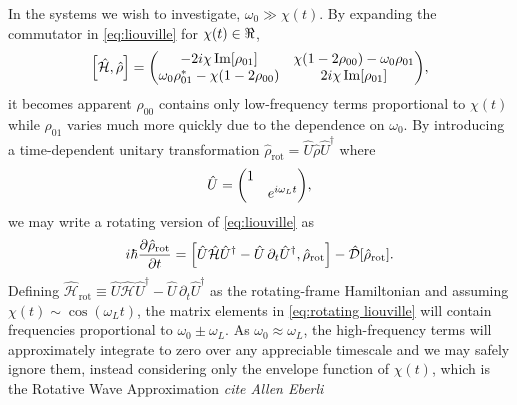 \documentclass[conference]{IEEEtran}
\begin{document}
In the systems we wish to investigate, $\omega_0 \gg \chi(t)$. By expanding the commutator in \cref{eq:liouville} for $\chi(t) \in \real$,
\begin{equation}
  \commutator{\hat{\mathcal{H}}}{\hat{\rho}} =
  \mqty(
    -2 i \chi \Im[\rho_{01}] & \chi\qty(1 - 2 \rho_{00}) - \omega_0 \rho_{01} \\ 
    \omega_0 \rho_{01}^* - \chi\qty(1 - 2\rho_{00}) & 2 i \chi \Im[\rho_{01}]
  ),
\end{equation}
it becomes apparent $\rho_{00}$ contains only low-frequency terms proportional to $\chi(t)$ while $\rho_{01}$ varies much more quickly due to the dependence on $\omega_0$.
By introducing a time-dependent unitary transformation $\hat{\rho}_\text{rot} = \hat{U}\hat{\rho}\hat{U}^\dagger$ where
\begin{equation}
  \hat{U} = \mqty(\dmat{1, e^{i \omega_L t}}), 
  \label{eq:unitary transformation}
\end{equation}
we may write a rotating version of \cref{eq:liouville} as
\begin{equation}
  i \hbar \pdv{\hat{\rho}_\text{rot}}{t} = \commutator{\hat{U} \hat{\mathcal{H}} \hat{U}^\dagger - \hat{U} \, \partial_t \hat{U}^\dagger}{\hat{\rho}_\text{rot}} - \hat{\mathcal{D}}[\hat{\rho}_\text{rot}].
  \label{eq:rotating liouville}
\end{equation}
Defining $\hat{\mathcal{H}}_\text{rot} \equiv \hat{U} \hat{\mathcal{H}} \hat{U}^\dagger - \hat{U} \, \partial_t \hat{U}^\dagger$ as the rotating-frame Hamiltonian and assuming $\chi(t) \sim \cos(\omega_L t)$, the matrix elements in \cref{eq:rotating liouville} will contain frequencies proportional to $\omega_0 \pm \omega_L$.
As $\omega_0 \approx \omega_L$, the high-frequency terms will approximately integrate to zero over any appreciable timescale and we may safely ignore them, instead considering only the envelope function of $\chi(t)$, which is the Rotative Wave Approximation {\it cite Allen Eberli}
\end{document}
